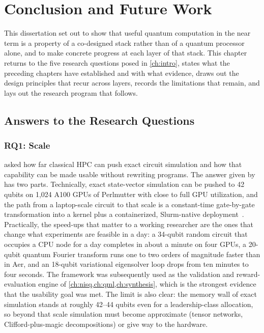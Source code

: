 \chapter{Conclusion and Future Work}\label{ch:conclusion}

This dissertation set out to show that useful quantum computation in the near term is a property of a co-designed stack rather than of a quantum processor alone, and to make concrete progress at each layer of that stack. This chapter returns to the five research questions posed in \cref{ch:intro}, states what the preceding chapters have established and with what evidence, draws out the design principles that recur across layers, records the limitations that remain, and lays out the research program that follows.

\section{Answers to the Research Questions}\label{sec:conclusion:answers}

\subsection{RQ1: Scale}\label{sec:conclusion:rq1}

 asked how far classical HPC can push exact circuit simulation and how that capability can be made usable without rewriting programs. The answer given by \qgear{} has two parts. Technically, exact state-vector simulation can be pushed to 42 qubits on 1,024 A100 GPUs of Perlmutter with close to full GPU utilization, and the path from a laptop-scale \qiskit{} circuit to that scale is a constant-time gate-by-gate transformation into a \cudaq{} kernel plus a containerized, Slurm-native deployment~\cite{guo2025qgear}. Practically, the speed-ups that matter to a working researcher are the ones that change what experiments are feasible in a day: a 34-qubit random circuit that occupies a CPU node for a day completes in about a minute on four GPUs, a 20-qubit quantum Fourier transform runs one to two orders of magnitude faster than in \qiskit{} Aer, and an 18-qubit variational eigensolver loop drops from ten minutes to four seconds. The framework was subsequently used as the validation and reward-evaluation engine of \cref{ch:nisq,ch:qml,ch:synthesis}, which is the strongest evidence that the usability goal was met. The limit is also clear: the memory wall of exact simulation stands at roughly 42--44 qubits even for a leadership-class allocation, so beyond that scale simulation must become approximate (tensor networks, Clifford-plus-magic decompositions) or give way to the hardware.

